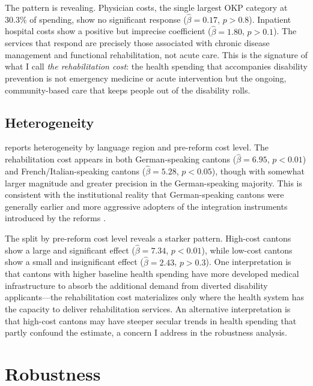 \documentclass[12pt]{article}
\begin{document}
The pattern is revealing. Physician costs, the single largest OKP category at 30.3\% of spending, show no significant response ($\hat{\beta} = 0.17$, $p > 0.8$). Inpatient hospital costs show a positive but imprecise coefficient ($\hat{\beta} = 1.80$, $p > 0.1$). The services that respond are precisely those associated with chronic disease management and functional rehabilitation, not acute care. This is the signature of what I call \emph{the rehabilitation cost}: the health spending that accompanies disability prevention is not emergency medicine or acute intervention but the ongoing, community-based care that keeps people out of the disability rolls.

\subsection{Heterogeneity}



 reports heterogeneity by language region and pre-reform cost level. The rehabilitation cost appears in both German-speaking cantons ($\hat{\beta} = 6.95$, $p < 0.01$) and French/Italian-speaking cantons ($\hat{\beta} = 5.28$, $p < 0.05$), though with somewhat larger magnitude and greater precision in the German-speaking majority. This is consistent with the institutional reality that German-speaking cantons were generally earlier and more aggressive adopters of the integration instruments introduced by the reforms \citep{bsv2012evaluation5}.

The split by pre-reform cost level reveals a starker pattern. High-cost cantons show a large and significant effect ($\hat{\beta} = 7.34$, $p < 0.01$), while low-cost cantons show a small and insignificant effect ($\hat{\beta} = 2.43$, $p > 0.3$). One interpretation is that cantons with higher baseline health spending have more developed medical infrastructure to absorb the additional demand from diverted disability applicants---the rehabilitation cost materializes only where the health system has the capacity to deliver rehabilitation services. An alternative interpretation is that high-cost cantons may have steeper secular trends in health spending that partly confound the estimate, a concern I address in the robustness analysis.


\section{Robustness}
\end{document}
